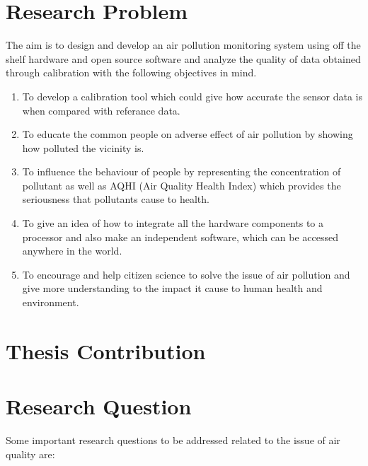 \section{Research Problem}
The aim is to design and develop an air pollution monitoring system using off the shelf
hardware and open source software and analyze the quality of data obtained through calibration with the following objectives in mind.
\begin{enumerate}
    \item To develop a calibration tool which could give how accurate the sensor data is when compared with referance data.
    
    \item To educate the common people on adverse effect of air pollution by showing how polluted
    the vicinity is.
    
    \item To influence the behaviour of people by representing the concentration of pollutant as well
    as AQHI (Air Quality Health Index) which provides the seriousness that pollutants cause
    to health.
    
    \item To give an idea of how to integrate all the hardware components to a processor and also
    make an independent software, which can be accessed anywhere in the world.
    
    \item To encourage and help citizen science to solve the issue of air pollution and give more
    understanding to the impact it cause to human health and environment.

\end{enumerate}


\section{Thesis Contribution}


\section{Research Question}
 
 Some important research questions to be addressed related to the issue of air quality are: 

